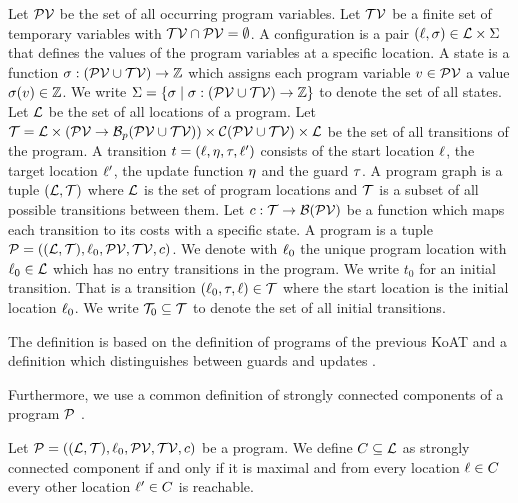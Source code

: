 \begin{definition}[Program] 
  Let $\mathcal{PV}$ be the set of all occurring program variables.
  Let $\mathcal{TV}$ be a finite set of temporary variables with $\mathcal{TV} \cap \mathcal{PV} = \emptyset$.
  A configuration is a pair $(\ell, \sigma) \in \mathcal{L} \times \Sigma$ that defines the values of the program variables at a specific location.
  A state is a function $\sigma: (\mathcal{PV} \cup \mathcal{TV}) \rightarrow \mathbb{Z}$ which assigns each program variable $v \in \mathcal{PV}$ a value $\sigma(v) \in \mathbb{Z}$.
  We write $\Sigma = \lbrace  \sigma \mid \sigma: (\mathcal{PV} \cup \mathcal{TV}) \rightarrow \mathbb{Z} \rbrace$ to denote the set of all states.
  Let $\mathcal{L}$ be the set of all locations of a program.
  Let $\mathcal{T} = \mathcal{L} \times (\mathcal{PV} \rightarrow \mathcal{B}_p(\mathcal{PV} \cup \mathcal{TV})) \times \mathcal{C}(\mathcal{PV} \cup \mathcal{TV}) \times \mathcal{L}$ be the set of all transitions of the program.
  A transition $t = (\ell, \eta, \tau, \ell')$ consists of the start location $\ell$, the target location $\ell'$, the update function $\eta$ and the guard $\tau$. 
  A program graph is a tuple $(\mathcal{L}, \mathcal{T})$ where $\mathcal{L}$ is the set of program locations and $\mathcal{T}$ is a subset of all possible transitions between them.
  Let $c: \mathcal{T} \rightarrow \mathcal{B}(\mathcal{PV})$ be a function which maps each transition to its costs with a specific state.
  A program is a tuple $\mathcal{P} = ((\mathcal{L}, \mathcal{T}), \ell_0, \mathcal{PV}, \mathcal{TV}, c)$.
  We denote with $\ell_0$ the unique program location with $\ell_0 \in \mathcal{L}$ which has no entry transitions in the program.
  We write $t_0$ for an initial transition. That is a transition $(\ell_0, \tau, \ell) \in \mathcal{T}$ where the start location is the initial location $\ell_0$.
  We write $\mathcal{T}_0 \subseteq \mathcal{T}$ to denote the set of all initial transitions.
\end{definition}
The definition is based on the definition of programs of the previous KoAT \cite{koat} and a definition which distinguishes between guards and updates \cite{lowerruntime}.

Furthermore, we use a common definition of strongly connected components of a program $\mathcal{P}$ \cite{sccs}.

\begin{definition}
  Let $\mathcal{P} = ((\mathcal{L}, \mathcal{T}), \ell_0, \mathcal{PV}, \mathcal{TV}, c)$ be a program.
  We define $C \subseteq \mathcal{L}$ as strongly connected component if and only if it is maximal and from every location $\ell \in C$ every other location $\ell' \in C$ is reachable.
\end{definition}

